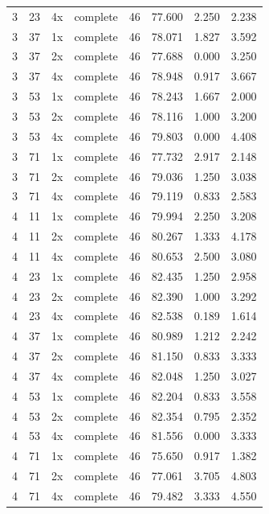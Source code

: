 \begin{longtable}{llllllll}
3 & 23 & 4x & complete & 46 & 77.600 & 2.250 & 2.238 \\
3 & 37 & 1x & complete & 46 & 78.071 & 1.827 & 3.592 \\
3 & 37 & 2x & complete & 46 & 77.688 & 0.000 & 3.250 \\
3 & 37 & 4x & complete & 46 & 78.948 & 0.917 & 3.667 \\
3 & 53 & 1x & complete & 46 & 78.243 & 1.667 & 2.000 \\
3 & 53 & 2x & complete & 46 & 78.116 & 1.000 & 3.200 \\
3 & 53 & 4x & complete & 46 & 79.803 & 0.000 & 4.408 \\
3 & 71 & 1x & complete & 46 & 77.732 & 2.917 & 2.148 \\
3 & 71 & 2x & complete & 46 & 79.036 & 1.250 & 3.038 \\
3 & 71 & 4x & complete & 46 & 79.119 & 0.833 & 2.583 \\
4 & 11 & 1x & complete & 46 & 79.994 & 2.250 & 3.208 \\
4 & 11 & 2x & complete & 46 & 80.267 & 1.333 & 4.178 \\
4 & 11 & 4x & complete & 46 & 80.653 & 2.500 & 3.080 \\
4 & 23 & 1x & complete & 46 & 82.435 & 1.250 & 2.958 \\
4 & 23 & 2x & complete & 46 & 82.390 & 1.000 & 3.292 \\
4 & 23 & 4x & complete & 46 & 82.538 & 0.189 & 1.614 \\
4 & 37 & 1x & complete & 46 & 80.989 & 1.212 & 2.242 \\
4 & 37 & 2x & complete & 46 & 81.150 & 0.833 & 3.333 \\
4 & 37 & 4x & complete & 46 & 82.048 & 1.250 & 3.027 \\
4 & 53 & 1x & complete & 46 & 82.204 & 0.833 & 3.558 \\
4 & 53 & 2x & complete & 46 & 82.354 & 0.795 & 2.352 \\
4 & 53 & 4x & complete & 46 & 81.556 & 0.000 & 3.333 \\
4 & 71 & 1x & complete & 46 & 75.650 & 0.917 & 1.382 \\
4 & 71 & 2x & complete & 46 & 77.061 & 3.705 & 4.803 \\
4 & 71 & 4x & complete & 46 & 79.482 & 3.333 & 4.550 \\
\bottomrule
\end{longtable}

